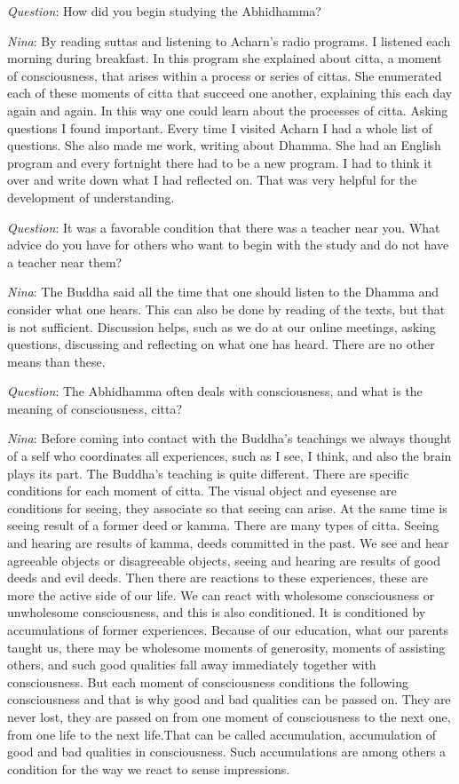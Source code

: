 \textit{Question}: How did you begin studying the Abhidhamma?



\textit{Nina}: By reading suttas and listening to Acharn’s radio programs. I listened each morning during breakfast. In this program she explained about citta, a moment of consciousness, that arises within a process or series of cittas. She enumerated each of these moments of citta that succeed one another, explaining this each day again and again. In this way one could learn about the processes of citta. 
Asking questions I found important. Every time I visited Acharn I had a whole list of questions. She also made me work, writing about Dhamma. She had an English program and every fortnight there had to be a new program. I had to think it over and write down what I had reflected on. That was very helpful for the development of understanding. 


\textit{Question}: It was a favorable condition that there was a teacher near you. What advice do you have for others who want to begin with the study and do not have a teacher near them?




\textit{Nina}: The Buddha said all the time that one should listen to the Dhamma and consider what one hears. This can also be done by reading of the texts, but that is not sufficient. Discussion helps, such as we do at our online meetings, asking questions, discussing and reflecting on what one has heard. There are no other means than these. 


\textit{Question}: The Abhidhamma often deals with consciousness, and what is the meaning of consciousness, citta?


\textit{Nina}: Before coming into contact with the Buddha’s teachings we always thought of a self who coordinates all experiences, such as I see, I think, and also the brain plays its part. The Buddha’s teaching is quite different. There are specific conditions for each moment of citta. The visual object and eyesense are conditions for seeing, they associate so that seeing can arise. At the same time is seeing result of a former deed or kamma. There are many types of citta. Seeing and hearing are results of kamma, deeds committed in the past. We see and hear agreeable objects or disagreeable objects, seeing and hearing are results of good deeds and evil deeds. Then there are reactions to these experiences, these are more the active side of our life. We can react with wholesome consciousness or unwholesome consciousness, and this is also conditioned. It is conditioned by accumulations of former experiences. Because of our education, what our parents taught us, there may be wholesome moments of generosity, moments of assisting others, and such good qualities fall away immediately together with consciousness. But each moment of consciousness conditions the following consciousness and that is why good and bad qualities can be passed on. They are never lost, they are passed on from one moment of consciousness to the next one, from one life to the next life.That can be called accumulation, accumulation of good and bad qualities in consciousness. Such accumulations are among others a condition for the way we react to sense impressions.


